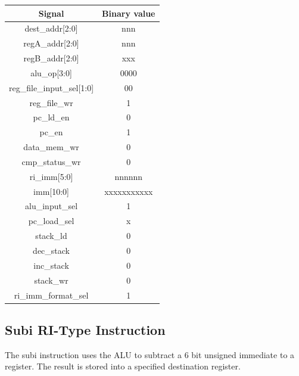 \documentclass{article}
\begin{document}
\begin{par}
	\begin{center}
		\begin{tabular}{|c|c|}
			\hline 
			\textbf{Signal} & \textbf{Binary value} \\ 
			\hline 
			dest\_addr[2:0] & nnn \\ 
			\hline 
			regA\_addr[2:0] & nnn \\ 
			\hline 
			regB\_addr[2:0] & xxx \\ 
			\hline 
			alu\_op[3:0] & 0000 \\ 
			\hline 
			reg\_file\_input\_sel[1:0] & 00 \\ 
			\hline 
			reg\_file\_wr & 1 \\ 
			\hline 
			pc\_ld\_en & 0 \\ 
			\hline 
			pc\_en & 1 \\ 
			\hline 
			data\_mem\_wr & 0 \\ 
			\hline 
			cmp\_status\_wr & 0 \\ 
			\hline 
			ri\_imm[5:0] & nnnnnn \\ 
			\hline 
			imm[10:0] & xxxxxxxxxxx \\ 
			\hline 
			alu\_input\_sel & 1 \\ 
			\hline 
			pc\_load\_sel & x \\ 
			\hline 
			stack\_ld & 0 \\ 
			\hline 
			dec\_stack & 0 \\ 
			\hline 
			inc\_stack & 0 \\ 
			\hline 
			stack\_wr & 0 \\ 
			\hline 
			ri\_imm\_format\_sel & 1 \\ 
			\hline 
		\end{tabular} 
	\end{center}

	\newpage
	\subsection{Subi RI-Type Instruction}
	
	The subi instruction uses the ALU to subtract a 6 bit unsigned immediate to a register. The result is stored into a specified destination register. 
	

\end{par}
\end{document}
